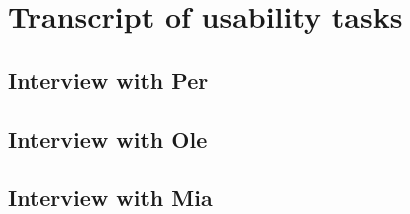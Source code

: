 \section{Transcript of usability tasks}\label{appendix:usability_transcript}
\subsection{Interview with Per}

\subsection{Interview with Ole}



\subsection{Interview with Mia}


